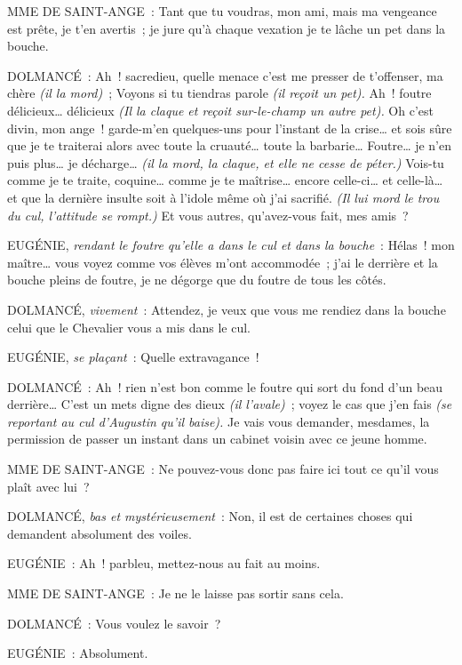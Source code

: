 \documentclass[french,twoside]{book} %
\begin{document}
MME DE SAINT-ANGE : Tant que tu voudras, mon ami, mais ma vengeance est prête, je t’en avertis ; je jure qu’à chaque vexation je te lâche un pet dans la bouche.\par
DOLMANCÉ : Ah ! sacredieu, quelle menace c’est me presser de t’offenser, ma chère {\itshape (il la mord)} ; Voyons si tu tiendras parole {\itshape (il reçoit un pet).} Ah ! foutre délicieux… délicieux {\itshape (Il la claque et reçoit sur-le-champ un autre pet).} Oh c’est divin, mon ange ! garde-m’en quelques-uns pour l’instant de la crise… et sois sûre que je te traiterai alors avec toute la cruauté… toute la barbarie… Foutre… je n’en puis plus… je décharge… {\itshape (il la mord, la claque, et elle ne cesse de péter.)} Vois-tu comme je te traite, coquine… comme je te maîtrise… encore celle-ci… et celle-là… et que la dernière insulte soit à l’idole même où j’ai sacrifié. {\itshape (Il lui mord le trou du cul, l’attitude se rompt.)} Et vous autres, qu’avez-vous fait, mes amis ?\par
EUGÉNIE, {\itshape rendant le foutre qu’elle a dans le cul et dans la bouche} : Hélas ! mon maître… vous voyez comme vos élèves m’ont accommodée ; j’ai le derrière et la bouche pleins de foutre, je ne dégorge que du foutre de tous les côtés.\par
DOLMANCÉ, {\itshape vivement} : Attendez, je veux que vous me rendiez dans la bouche celui que le Chevalier vous a mis dans le cul.\par
EUGÉNIE, {\itshape se plaçant} : Quelle extravagance !\par
DOLMANCÉ : Ah ! rien n’est bon comme le foutre qui sort du fond d’un beau derrière… C’est un mets digne des dieux {\itshape (il l’avale)} ; voyez le cas que j’en fais {\itshape (se reportant au cul d’Augustin qu’il baise).} Je vais vous demander, mesdames, la permission de passer un instant dans un cabinet voisin avec ce jeune homme.\par
MME DE SAINT-ANGE : Ne pouvez-vous donc pas faire ici tout ce qu’il vous plaît avec lui ?\par
DOLMANCÉ, {\itshape bas et mystérieusement} : Non, il est de certaines choses qui demandent absolument des voiles.\par
EUGÉNIE : Ah ! parbleu, mettez-nous au fait au moins.\par
MME DE SAINT-ANGE : Je ne le laisse pas sortir sans cela.\par
DOLMANCÉ : Vous voulez le savoir ?\par
EUGÉNIE : Absolument.\par
\end{document}

